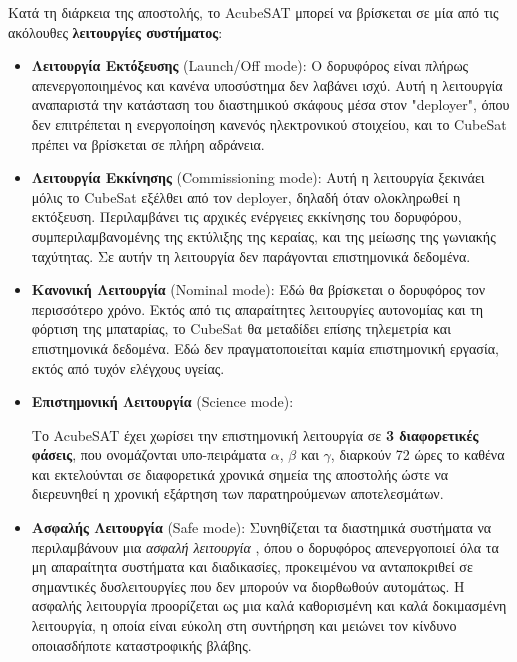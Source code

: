 \documentclass[a4paper,nobib]{tufte-book}
\begin{document}
Κατά τη διάρκεια της αποστολής, το AcubeSAT μπορεί να βρίσκεται σε μία από τις ακόλουθες \textbf{λειτουργίες συστήματος}: \autocite{MDO}
\begin{itemize}
	\item \textbf{Λειτουργία Εκτόξευσης} (Launch/Off mode): Ο δορυφόρος είναι πλήρως απενεργοποιημένος και κανένα υποσύστημα δεν λαβάνει ισχύ. Αυτή η λειτουργία αναπαριστά την κατάσταση του διαστημικού σκάφους μέσα στον "deployer", όπου δεν επιτρέπεται η ενεργοποίηση κανενός ηλεκτρονικού στοιχείου, \autocite[req. 3.3.3]{CDS13} και το CubeSat πρέπει να βρίσκεται σε πλήρη αδράνεια.
	
	\item \textbf{Λειτουργία Εκκίνησης} (Commissioning mode): Αυτή η λειτουργία ξεκινάει μόλις το CubeSat εξέλθει από τον deployer, δηλαδή όταν ολοκληρωθεί η εκτόξευση. Περιλαμβάνει τις αρχικές ενέργειες εκκίνησης του δορυφόρου, συμπεριλαμβανομένης της εκτύλιξης της κεραίας, και της μείωσης της γωνιακής ταχύτητας. Σε αυτήν τη λειτουργία δεν παράγονται επιστημονικά δεδομένα.
	
	\item \textbf{Κανονική Λειτουργία} (Nominal mode): Εδώ θα βρίσκεται ο δορυφόρος τον περισσότερο χρόνο. Εκτός από τις απαραίτητες λειτουργίες αυτονομίας και τη φόρτιση της μπαταρίας, το CubeSat θα μεταδίδει επίσης τηλεμετρία και επιστημονικά δεδομένα. Εδώ δεν πραγματοποιείται καμία επιστημονική εργασία, εκτός από τυχόν ελέγχους υγείας. %
	
	\item \textbf{Επιστημονική Λειτουργία} (Science mode): 
	
	Το AcubeSAT έχει χωρίσει την επιστημονική λειτουργία σε \textbf{3 διαφορετικές φάσεις}, που ονομάζονται υπο-πειράματα \(\alpha\), \(\beta\) και \(\gamma\), διαρκούν 72 ώρες το καθένα και εκτελούνται σε διαφορετικά χρονικά σημεία της αποστολής ώστε να διερευνηθεί η χρονική εξάρτηση των παρατηρούμενων αποτελεσμάτων.
	
	\item \textbf{Ασφαλής Λειτουργία} (Safe mode): Συνηθίζεται τα διαστημικά συστήματα να περιλαμβάνουν μια \emph{ασφαλή λειτουργία} \autocite[385]{aguirre_introduction_space_2013}, όπου ο δορυφόρος απενεργοποιεί όλα τα μη απαραίτητα συστήματα και διαδικασίες, προκειμένου να ανταποκριθεί σε σημαντικές δυσλειτουργίες που δεν μπορούν να διορθωθούν αυτομάτως. Η ασφαλής λειτουργία προορίζεται ως μια καλά καθορισμένη και καλά δοκιμασμένη λειτουργία, η οποία είναι εύκολη στη συντήρηση και μειώνει τον κίνδυνο οποιασδήποτε καταστροφικής βλάβης.
\end{itemize}
\end{document}
